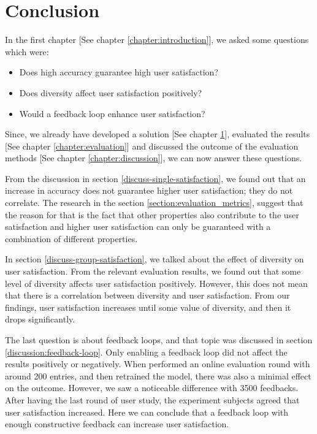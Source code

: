 
\chapter{Conclusion}\label{chapter:conclusion}

In the first chapter [See chapter \ref{chapter:introduction}], we asked some questions which were: 

\begin{itemize}
	\item Does high accuracy guarantee high user satisfaction?
	\item Does diversity affect user satisfaction positively?
	\item Would a feedback loop enhance user satisfaction?
\end{itemize}

Since, we already have developed a solution [See chapter \ref{chapter:conclusion}], evaluated the results [See chapter \ref{chapter:evaluation}] and discussed the outcome of the evaluation methods [See chapter \ref{chapter:discussion}], we can now answer these questions.

From the discussion in section \ref{discuss-single-satisfaction}, we found out that an increase in accuracy does not guarantee higher user satisfaction; they do not correlate. The research in the section \ref{section:evaluation_metrics}, suggest that the reason for that is the fact that other properties also contribute to the user satisfaction and higher user satisfaction can only be guaranteed with a combination of different properties.

In section \ref{discuss-group-satisfaction}, we talked about the effect of diversity on user satisfaction. From the relevant evaluation results, we found out that some level of diversity affects user satisfaction positively. However, this does not mean that there is a correlation between diversity and user satisfaction. From our findings, user satisfaction increases until some value of diversity, and then it drops significantly.

The last question is about feedback loops, and that topic was discussed in section \ref{discussion:feedback-loop}. Only enabling a feedback loop did not affect the results positively or negatively. When performed an online evaluation round with around 200 entries, and then retrained the model, there was also a minimal effect on the outcome. However, we saw a noticeable difference with 3500 feedbacks. After having the last round of user study, the experiment subjects agreed that user satisfaction increased. Here we can conclude that a feedback loop with enough constructive feedback can increase user satisfaction.
